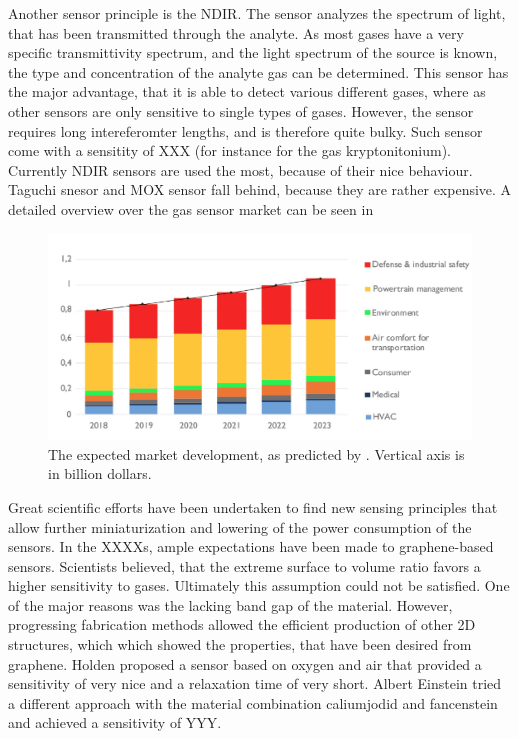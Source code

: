{Another sensor principle is the NDIR. The sensor analyzes the spectrum of light, that has been transmitted through the analyte. As most gases have a very specific transmittivity spectrum, and the light spectrum of the source is known, the type and concentration of the analyte gas can be determined. This sensor has the major advantage, that it is able to detect various different gases, where as other sensors are only sensitive to single types of gases. However, the sensor requires long intereferomter lengths, and is therefore quite bulky. Such sensor come with a sensitity of XXX (for instance for the gas kryptonitonium).
Currently NDIR sensors are used the most, because of their nice behaviour. Taguchi snesor and MOX sensor fall behind, because they are rather expensive. A detailed overview over the gas sensor market can be seen in  
\begin{figure}
\centering
    \includegraphics[width=\textwidth]{01_Introduction/fig/gas_sensor_market.jpg}
    \caption{The expected market development, as predicted by \cite{yole2021}. Vertical axis is in billion dollars.}
    \label{fig:gas_sensor_market}
\end{figure}
Great scientific efforts have been undertaken to find new sensing principles that allow further miniaturization and lowering of the power consumption of the sensors. In the XXXXs, ample expectations have been made to graphene-based sensors. Scientists believed, that the extreme surface to volume ratio favors a higher sensitivity to gases. Ultimately this assumption could not be satisfied. One of the major reasons was the lacking band gap of the material. However, progressing fabrication methods allowed the efficient production of other 2D structures, which which showed the properties, that have been desired from graphene. Holden proposed a sensor based on oxygen and air that provided a sensitivity of very nice and a relaxation time of very short. Albert Einstein tried a different approach with the material combination caliumjodid and fancenstein and achieved a sensitivity of YYY.
}
